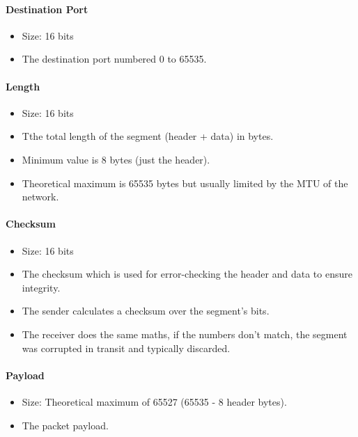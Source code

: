 \documentclass{article}
\begin{document}
\paragraph{Destination Port}

\begin{itemize}
    \item Size: 16 bits
    \item The destination port numbered 0 to 65535.
\end{itemize}

\paragraph{Length}

\begin{itemize}
    \item Size: 16 bits
    \item Tthe total length of the segment (header + data) in bytes.
    \item Minimum value is 8 bytes (just the header).
    \item Theoretical maximum is 65535 bytes but usually limited by the MTU of the network.
\end{itemize}

\paragraph{Checksum}

\begin{itemize}
    \item Size: 16 bits
    \item The checksum which is used for error-checking the header and data to ensure integrity.
    \item The sender calculates a checksum over the segment's bits.
    \item The receiver does the same maths, if the numbers don't match, the segment was corrupted in transit and typically discarded.
\end{itemize}

\paragraph{Payload}

\begin{itemize}
    \item Size: Theoretical maximum of 65527 (65535 - 8 header bytes).
    \item The packet payload.
\end{itemize}
\end{document}
